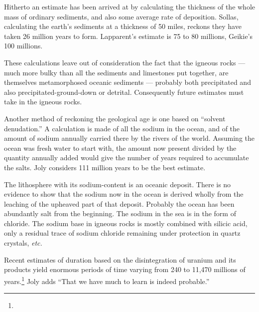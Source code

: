 \documentclass[a4paper, 12pt, oneside]{article}
\begin{document}
Hitherto an estimate has been arrived at by calculating the thickness of the whole mass of ordinary sediments, and also some average rate of deposition. Sollas, calculating the earth's sediments at a thickness of 50 miles, reckons they have taken 26 million years to form. Lapparent's estimate is 75 to 80 millions, Geikie's 100 millions.

These calculations leave out of consideration the fact that the igneous rocks --- much more bulky than all the sediments and limestones put together, are themselves metamorphosed oceanic sediments --- probably both precipitated and also precipitated-ground-down or detrital. Consequently future estimates must take in the igneous rocks.

Another method of reckoning the geological age is one based on ``solvent denudation.'' A calculation is made of all the sodium in the ocean, and of the amount of sodium annually carried there by the rivers of the world. Assuming the ocean was fresh water to start with, the amount now present divided by the quantity annually added would give the number of years required to accumulate the salts. Joly considers 111 million years to be the best estimate.

The lithosphere with its sodium-content is an oceanic deposit. There is no evidence to show that the sodium now in the ocean is derived wholly from the leaching of the upheaved part of that deposit. Probably the ocean has been abundantly salt from the beginning. The sodium in the sea is in the form of chloride. The sodium base in igneous rocks is mostly combined with silicic acid, only a residual trace of sodium chloride remaining under protection in quartz crystals, \emph{etc.}

Recent estimates of duration based on the disintegration of uranium and its products yield enormous periods of time varying from 240 to 11,470 millions of years.\footnote{} Joly adds ``That we have much to learn is indeed probable.''
\end{document}
